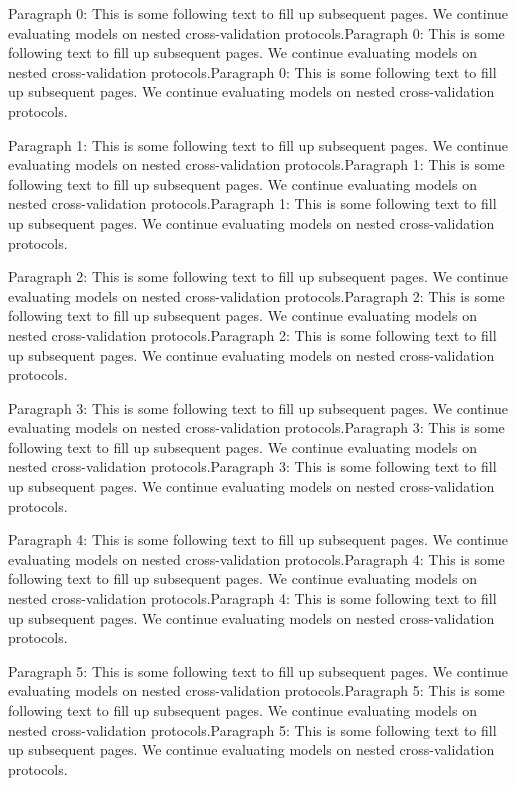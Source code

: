 \documentclass{IEEEtran}
\begin{document}
Paragraph 0: This is some following text to fill up subsequent pages. We continue evaluating models on nested cross-validation protocols.Paragraph 0: This is some following text to fill up subsequent pages. We continue evaluating models on nested cross-validation protocols.Paragraph 0: This is some following text to fill up subsequent pages. We continue evaluating models on nested cross-validation protocols.

Paragraph 1: This is some following text to fill up subsequent pages. We continue evaluating models on nested cross-validation protocols.Paragraph 1: This is some following text to fill up subsequent pages. We continue evaluating models on nested cross-validation protocols.Paragraph 1: This is some following text to fill up subsequent pages. We continue evaluating models on nested cross-validation protocols.

Paragraph 2: This is some following text to fill up subsequent pages. We continue evaluating models on nested cross-validation protocols.Paragraph 2: This is some following text to fill up subsequent pages. We continue evaluating models on nested cross-validation protocols.Paragraph 2: This is some following text to fill up subsequent pages. We continue evaluating models on nested cross-validation protocols.

Paragraph 3: This is some following text to fill up subsequent pages. We continue evaluating models on nested cross-validation protocols.Paragraph 3: This is some following text to fill up subsequent pages. We continue evaluating models on nested cross-validation protocols.Paragraph 3: This is some following text to fill up subsequent pages. We continue evaluating models on nested cross-validation protocols.

Paragraph 4: This is some following text to fill up subsequent pages. We continue evaluating models on nested cross-validation protocols.Paragraph 4: This is some following text to fill up subsequent pages. We continue evaluating models on nested cross-validation protocols.Paragraph 4: This is some following text to fill up subsequent pages. We continue evaluating models on nested cross-validation protocols.

Paragraph 5: This is some following text to fill up subsequent pages. We continue evaluating models on nested cross-validation protocols.Paragraph 5: This is some following text to fill up subsequent pages. We continue evaluating models on nested cross-validation protocols.Paragraph 5: This is some following text to fill up subsequent pages. We continue evaluating models on nested cross-validation protocols.
\end{document}
